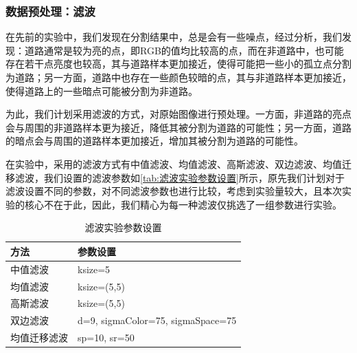 \documentclass[12pt,hyperref,a4paper,UTF8]{ctexart}
\begin{document}
\subsubsection{数据预处理：滤波}
在先前的实验中，我们发现在分割结果中，总是会有一些噪点，经过分析，我们发现：道路通常是较为亮的点，即RGB的值均比较高的点，而在非道路中，也可能存在若干点亮度也较高，其与道路样本更加接近，使得可能把一些小的孤立点分割为道路；另一方面，道路中也存在一些颜色较暗的点，其与非道路样本更加接近，使得道路上的一些暗点可能被分割为非道路。
\par
为此，我们计划采用滤波的方式，对原始图像进行预处理。一方面，非道路的亮点会与周围的非道路样本更为接近，降低其被分割为道路的可能性；另一方面，道路的暗点会与周围的道路样本更加接近，增加其被分割为道路的可能性。
\par
在实验中，采用的滤波方式有中值滤波、均值滤波、高斯滤波、双边滤波、均值迁移滤波，我们设置的滤波参数如\autoref{tab:滤波实验参数设置}所示，原先我们计划对于滤波设置不同的参数，对不同滤波参数也进行比较，考虑到实验量较大，且本次实验的核心不在于此，因此，我们精心为每一种滤波仅挑选了一组参数进行实验。

\begin{table}[!htbp]

\caption{滤波实验参数设置}
    \centering
    \begin{tabular}{ll}
    \hline
        \textbf{方法} & \textbf{参数设置} \\
        \hline
        中值滤波  & ksize=5 \\
     	
        均值滤波 & ksize=(5,5) \\
        
        高斯滤波  & ksize=(5,5) \\
        
        双边滤波  & d=9, sigmaColor=75, sigmaSpace=75 \\
        
        均值迁移滤波  & sp=10, sr=50 \\
        \hline
    \end{tabular}
    \label{tab:滤波实验参数设置}
\end{table}
\end{document}
